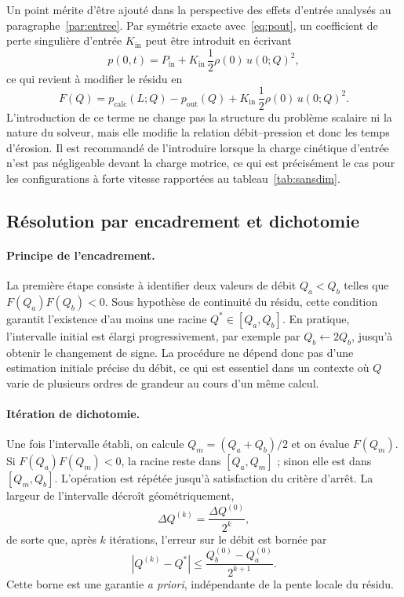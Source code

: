 \documentclass[11pt,a4paper]{report}
\newcommand{\kin}{K_{\mathrm{in}}}
\begin{document}
Un point mérite d'être ajouté dans la perspective des effets d'entrée analysés au
paragraphe~\ref{par:entree}. Par symétrie exacte avec~\eqref{eq:pout}, un coefficient de perte singulière
d'entrée \(\kin\) peut être introduit en écrivant
\begin{equation}
p(0,t) = P_{\mathrm{in}} + \kin\,\frac{1}{2}\rho(0)\,u(0;Q)^2 ,
\label{eq:pin}
\end{equation}
ce qui revient à modifier le résidu en
\begin{equation}
F(Q) = p_{\mathrm{calc}}(L;Q) - p_{\mathrm{out}}(Q)
+ \kin\,\frac{1}{2}\rho(0)\,u(0;Q)^2 .
\label{eq:FQ-kin}
\end{equation}
L'introduction de ce terme ne change pas la structure du problème scalaire ni la nature du solveur, mais
elle modifie la relation débit--pression et donc les temps d'érosion. Il est recommandé de l'introduire
lorsque la charge cinétique d'entrée n'est pas négligeable devant la charge motrice, ce qui est
précisément le cas pour les configurations à forte vitesse rapportées au tableau~\ref{tab:sansdim}.

\subsection{Résolution par encadrement et dichotomie}
\label{sec:bracketing}

\paragraph{Principe de l'encadrement.} La première étape consiste à identifier deux valeurs de débit
\(Q_a<Q_b\) telles que \(F(Q_a)F(Q_b)<0\). Sous hypothèse de continuité du résidu, cette condition garantit
l'existence d'au moins une racine \(Q^*\in[Q_a,Q_b]\). En pratique, l'intervalle initial est élargi
progressivement, par exemple par \(Q_b \leftarrow 2Q_b\), jusqu'à obtenir le changement de signe. La
procédure ne dépend donc pas d'une estimation initiale précise du débit, ce qui est essentiel dans un
contexte où \(Q\) varie de plusieurs ordres de grandeur au cours d'un même calcul.

\paragraph{Itération de dichotomie.} Une fois l'intervalle établi, on calcule \(Q_m = (Q_a+Q_b)/2\) et on
évalue \(F(Q_m)\). Si \(F(Q_a)F(Q_m)<0\), la racine reste dans \([Q_a,Q_m]\) ; sinon elle est dans
\([Q_m,Q_b]\). L'opération est répétée jusqu'à satisfaction du critère d'arrêt. La largeur de l'intervalle
décroît géométriquement,
\begin{equation}
\Delta Q^{(k)} = \frac{\Delta Q^{(0)}}{2^{k}},
\label{eq:bisection-decay}
\end{equation}
de sorte que, après \(k\) itérations, l'erreur sur le débit est bornée par
\begin{equation}
\left|Q^{(k)}-Q^*\right| \le \frac{Q_b^{(0)}-Q_a^{(0)}}{2^{k+1}} .
\label{eq:bisection-borne}
\end{equation}
Cette borne est une garantie \emph{a priori}, indépendante de la pente locale du résidu.
\end{document}

